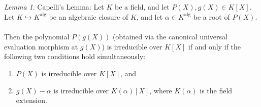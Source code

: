\documentclass[11pt, a4paper, oneside]{article}
\theoremstyle{remark}
\theoremstyle{lemma}
\newtheorem*{lemma}{Lemma}
\begin{document}
\subsection{}
\label{A.1}
\begin{lemma}{Capelli's Lemma:}  
Let \( K \) be a field, and let \( P(X), g(X) \in K[X] \). Let \( K \hookrightarrow K^{\text{alg}} \) be an algebraic closure of \( K \), and let \( \alpha \in K^{\text{alg}} \) be a root of \( P(X) \).  
\\\\
Then the polynomial \( P\left( g(X) \right) \) (obtained via the canonical universal evaluation morphism at \( g(X) \)) is irreducible over \( K[X] \) if and only if the following two conditions hold simultaneously:
\begin{enumerate}
    \item \( P(X) \) is irreducible over \( K[X] \), and
    \item \( g(X) - \alpha \) is irreducible over \( K(\alpha)[X] \), where \( K(\alpha) \) is the field extension.
\end{enumerate}
\end{lemma}
\end{document}
